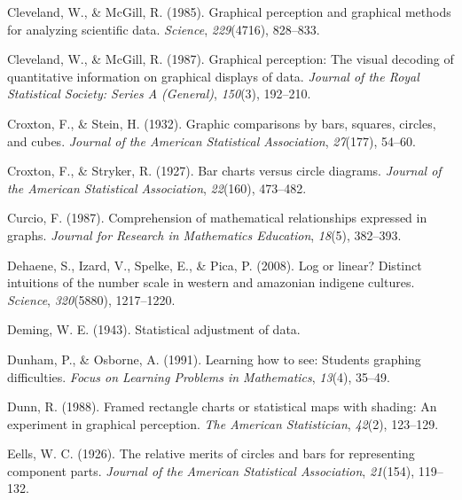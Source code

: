 \documentclass[print]{nuthesis}
\newlength{\cslhangindent}
\newenvironment{CSLReferences}[2]%
{\setlength{\parindent}{0pt}%
\everypar{\setlength{\hangindent}{\cslhangindent}}\ignorespaces}%
{\par}
\begin{document}
\begin{CSLReferences}{1}{0}
\leavevmode{}%
Cleveland, W., \& McGill, R. (1985). Graphical perception and graphical methods for analyzing scientific data. \emph{Science}, \emph{229}(4716), 828--833.

\leavevmode{}%
Cleveland, W., \& McGill, R. (1987). Graphical perception: The visual decoding of quantitative information on graphical displays of data. \emph{Journal of the Royal Statistical Society: Series A (General)}, \emph{150}(3), 192--210.

\leavevmode{}%
Croxton, F., \& Stein, H. (1932). Graphic comparisons by bars, squares, circles, and cubes. \emph{Journal of the American Statistical Association}, \emph{27}(177), 54--60.

\leavevmode{}%
Croxton, F., \& Stryker, R. (1927). Bar charts versus circle diagrams. \emph{Journal of the American Statistical Association}, \emph{22}(160), 473--482.

\leavevmode{}%
Curcio, F. (1987). Comprehension of mathematical relationships expressed in graphs. \emph{Journal for Research in Mathematics Education}, \emph{18}(5), 382--393.

\leavevmode{}%
Dehaene, S., Izard, V., Spelke, E., \& Pica, P. (2008). Log or linear? Distinct intuitions of the number scale in western and amazonian indigene cultures. \emph{Science}, \emph{320}(5880), 1217--1220.

\leavevmode{}%
Deming, W. E. (1943). Statistical adjustment of data.

\leavevmode{}%
Dunham, P., \& Osborne, A. (1991). Learning how to see: Students graphing difficulties. \emph{Focus on Learning Problems in Mathematics}, \emph{13}(4), 35--49.

\leavevmode{}%
Dunn, R. (1988). Framed rectangle charts or statistical maps with shading: An experiment in graphical perception. \emph{The American Statistician}, \emph{42}(2), 123--129.

\leavevmode{}%
Eells, W. C. (1926). The relative merits of circles and bars for representing component parts. \emph{Journal of the American Statistical Association}, \emph{21}(154), 119--132.


\end{CSLReferences}
\end{document}
